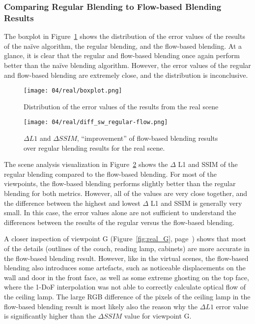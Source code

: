 \subsubsection{Comparing Regular Blending to Flow-based Blending Results}
The boxplot in Figure~\ref{fig:real_boxplot} shows the distribution of the error values of the results of the na\"ive algorithm, the regular blending, and the flow-based blending. At a glance, it is clear that the regular and flow-based blending once again perform better than the na\"ive blending algorithm. However, the error values of the regular and flow-based blending are extremely close, and the distribution is inconclusive. 

\begin{figure}
		\centering
		\texttt{[image: 04/real/boxplot.png]}
		\caption{Distribution of the error values of the results from the real scene}
		\label{fig:real_boxplot}
\end{figure}
\begin{figure}
		\centering
		\texttt{[image: 04/real/diff\_sw\_regular-flow.png]}
		\caption[$\Delta L1$ and $\Delta SSIM$ for the real scene]{$\Delta L1$ and $\Delta SSIM$, ``improvement'' of flow-based blending results over regular blending results for the real scene.}
		\label{fig:real_diff}
\end{figure}

The scene analysis visualization in Figure~\ref{fig:real_diff} shows the $\Delta$ L1 and SSIM of the regular blending compared to the flow-based blending.
For most of the viewpoints, the flow-based blending performs slightly better than the regular blending for both metrics. However, all of the values are very close together, and the difference between the highest and lowest $\Delta$ L1 and SSIM is generally very small. In this case, the error values alone are not sufficient to understand the differences between the results of the regular versus the flow-based blending.

A closer inspection of viewpoint G (Figure~\ref{fig:real_G}, page~\pageref{fig:real_G}) shows that most of the details (outlines of the couch, reading lamp, cabinets) are more accurate in the flow-based blending result. However, like in the virtual scenes, the flow-based blending also introduces some artefacts, such as noticeable displacements on the wall and door in the front face, as well as some extreme ghosting on the top face, where the 1-DoF interpolation was not able to correctly calculate optical flow of the ceiling lamp. The large RGB difference of the pixels of the ceiling lamp in the flow-based blending result is most likely also the reason why the $\Delta L1$ error value is significantly higher than the $\Delta SSIM$ value for viewpoint G.

